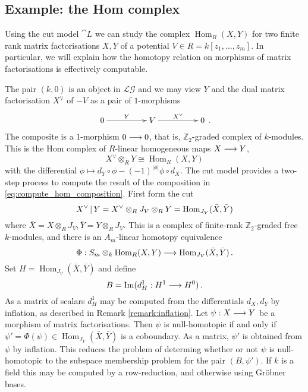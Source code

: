 \documentclass[english,letter paper,12pt,leqno]{article}
\theoremstyle{example}
\numberwithin{equation}{section}
\def\im{\operatorname{Im}}
\def\LG{\mathcal{LG}}
\def\Hom{\operatorname{Hom}}
\begin{document}
\subsection{Example: the Hom complex}\label{example:computing_homs}

Using the cut model $\cat{L}$ we can study the complex $\Hom_R(X,Y)$ for two finite rank matrix factorisations $X,Y$ of a potential $V \in R = k[z_1,\ldots,z_m]$. In particular, we will explain how the homotopy relation on morphisms of matrix factorisations is effectively computable.

The pair $(k,0)$ is an object in $\LG$ and we may view $Y$ and the dual matrix factorisation $X^{\vee}$ of $-V$ as a pair of $1$-morphisms
\begin{equation}\label{eq:compute_hom_composition}
\xymatrix@C+2pc{
0 \ar[r]^-{Y} & V \ar[r]^-{X^{\vee}} & 0
}\,.
\end{equation}
The composite is a $1$-morphism $0 \longrightarrow 0$, that is, $\mathbb{Z}_2$-graded complex of $k$-modules. This is the Hom complex of $R$-linear homogeneous maps $X \longrightarrow Y$,
\[
X^{\vee} \otimes_R Y \cong \Hom_R(X, Y)
\]
with the differential $\phi \mapsto d_Y \circ \phi - (-1)^{|\phi|} \phi \circ d_X$. The cut model provides a two-step process to compute the result of the composition in \eqref{eq:compute_hom_composition}. First form the cut
\[
X^{\vee} \l Y = X^{\vee} \otimes_R J_V \otimes_R Y = \Hom_{J_V}( \bar{X}, \bar{Y} )
\]
where $\bar{X} = X \otimes_R J_V, \bar{Y} = Y \otimes_R J_V$. This is a complex of finite-rank $\mathbb{Z}_2$-graded free $k$-modules, and there is an $A_m$-linear homotopy equivalence
\[
\Phi: S_m \otimes_k \Hom_R(X,Y) \lto \Hom_{J_V}( \bar{X}, \bar{Y} )\,.
\]
Set $H = \Hom_{J_V}( \bar{X}, \bar{Y} )$ and define
\[
B = \im( d^1_H: H^1 \lto H^0 )\,.
\]
As a matrix of scalars $d^1_H$ may be computed from the differentials $d_X, d_Y$ by inflation, as described in Remark \ref{remark:inflation}. Let $\psi: X \longrightarrow Y$ be a morphism of matrix factorisations. Then $\psi$ is null-homotopic if and only if $\psi' = \Phi(\psi) \in \Hom_{J_V}( \bar{X}, \bar{Y} )$ is a coboundary. As a matrix, $\psi'$ is obtained from $\psi$ by inflation. This reduces the problem of determing whether or not $\psi$ is null-homotopic to the subspace membership problem for the pair $(B, \psi')$. If $k$ is a field this may be computed by a row-reduction, and otherwise using Gr\"obner bases.
\end{document}
